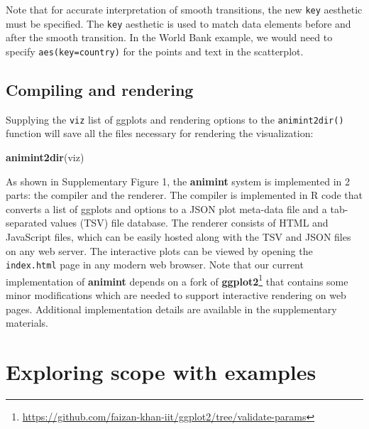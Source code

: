 \documentclass[12pt,]{article}
\newenvironment{Shaded}{\begin{snugshade}}{\end{snugshade}}
\newcommand{\DataTypeTok}[1]{\textcolor[rgb]{0.13,0.29,0.53}{#1}}
\newcommand{\DecValTok}[1]{\textcolor[rgb]{0.00,0.00,0.81}{#1}}
\newcommand{\KeywordTok}[1]{\textcolor[rgb]{0.13,0.29,0.53}{\textbf{#1}}}
\newcommand{\NormalTok}[1]{#1}
\newcommand{\OperatorTok}[1]{\textcolor[rgb]{0.81,0.36,0.00}{\textbf{#1}}}
\newcommand{\StringTok}[1]{\textcolor[rgb]{0.31,0.60,0.02}{#1}}
\let\rmarkdownfootnote\footnote%
\def\footnote{\protect\rmarkdownfootnote}
\theoremstyle{definition}
\theoremstyle{definition}
\theoremstyle{definition}
\theoremstyle{remark}
\begin{document}
\begin{Shaded}
\end{Shaded}

Note that for accurate interpretation of smooth transitions, the new
\texttt{key} aesthetic must be specified. The \texttt{key} aesthetic is
used to match data elements before and after the smooth transition. In
the World Bank example, we would need to specify
\texttt{aes(key=country)} for the points and text in the scatterplot.

\hypertarget{compiling-and-rendering}{%
\subsection{Compiling and rendering}\label{compiling-and-rendering}}

Supplying the \texttt{viz} list of ggplots and rendering options to the
\texttt{animint2dir()} function will save all the files necessary for
rendering the visualization:

\begin{Shaded}
\begin{Highlighting}[]
\KeywordTok{animint2dir}\NormalTok{(viz)}
\end{Highlighting}
\end{Shaded}

As shown in Supplementary Figure 1, the \textbf{animint} system is
implemented in 2 parts: the compiler and the renderer. The compiler is
implemented in R code that converts a list of ggplots and options to a
JSON plot meta-data file and a tab-separated values (TSV) file database.
The renderer consists of HTML and JavaScript files, which can be easily
hosted along with the TSV and JSON files on any web server. The
interactive plots can be viewed by opening the \texttt{index.html} page
in any modern web browser. Note that our current implementation of
\textbf{animint} depends on a fork of
\textbf{ggplot2}\footnote{\url{https://github.com/faizan-khan-iit/ggplot2/tree/validate-params}}
that contains some minor modifications which are needed to support
interactive rendering on web pages. Additional implementation details
are available in the supplementary materials.

\hypertarget{performance}{%
\section{Exploring scope with examples}\label{performance}}
\end{document}
